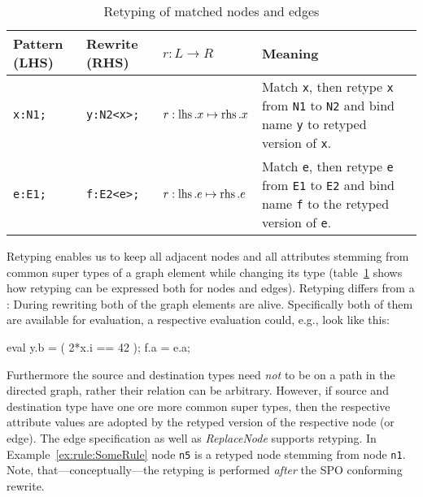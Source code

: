 \begin{table}[htbp]
\centering
\begin{tabularx}{\linewidth}{lllX}
  \textbf{Pattern (LHS)} & \textbf{Rewrite (RHS)} & \textbf{$r: L \longrightarrow R$} & \textbf{Meaning} \\ \hline
  \texttt{x:N1;} & \texttt{y:N2<x>;}          & $r:\operatorname{lhs}.x \mapsto \operatorname{rhs}.x$ & Match \texttt{x}, then retype \texttt{x} from \texttt{N1} to \texttt{N2} and bind name \texttt{y} to retyped version of \texttt{x}.\\
  \texttt{e:E1;} & \texttt{f:E2<e>;}          & $r:\operatorname{lhs}.e \mapsto \operatorname{rhs}.e$ & Match \texttt{e}, then retype \texttt{e} from \texttt{E1} to \texttt{E2} and bind name \texttt{f} to the retyped version of \texttt{e}.\\
\end{tabularx}
\caption{Retyping of matched nodes and edges}
\label{rule:retyping_graphlets}
\end{table}

Retyping enables us to keep all adjacent nodes and all attributes stemming from common super types of a graph element while changing its type (table~\ref{rule:retyping_graphlets} shows how retyping can be expressed both for nodes and edges).
Retyping differs from a : During rewriting both of the graph elements are alive.
  Specifically both of them are available for evaluation, a respective evaluation could, e.g., look like this:
  \begin{grgenlet}
eval {
  y.b = ( 2*x.i == 42 );
  f.a = e.a;
}
  \end{grgenlet}
Furthermore the source and destination types need \emph{not} to be on a path in the directed  graph, rather their relation can be arbitrary.
However, if source and destination type have one ore more common super types, then the respective attribute values are adopted by the retyped version of the respective node (or edge).
The edge specification as well as \emph{ReplaceNode} supports retyping.
In Example~\ref{ex:rule:SomeRule} node \texttt{n5} is a retyped node stemming from node \texttt{n1}.
Note, that---conceptually---the retyping is performed \emph{after} the SPO conforming rewrite.


